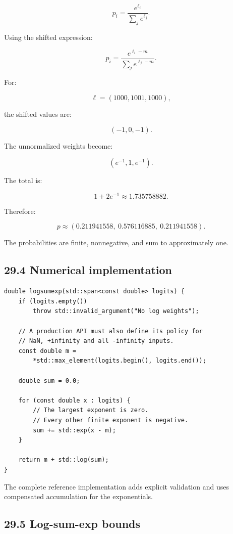 \[ \boxed{ p_i= \frac{e^{\ell_i}} {\sum_je^{\ell_j}} }. \]

Using the shifted expression:

\[ \boxed{ p_i= \frac{e^{\ell_i-m}} {\sum_je^{\ell_j-m}} }. \]

For:

\[ \ell=(1000,1001,1000), \]

the shifted values are:

\[ (-1,0,-1). \]

The unnormalized weights become:

\[ (e^{-1},1,e^{-1}). \]

The total is:

\[ 1+2e^{-1}\approx1.735758882. \]

Therefore:

\[ \boxed{ p\approx (0.211941558,\ 0.576116885,\ 0.211941558) }. \]

The probabilities are finite, nonnegative, and sum to approximately one.

\subsection{29.4 Numerical implementation}\label{02-foundations-ii-ch031-numerical-implementation}

\hypertarget{02-foundations-ii-ch031-numerical-implementation}{}

\begin{verbatim}
double logsumexp(std::span<const double> logits) {
    if (logits.empty())
        throw std::invalid_argument("No log weights");

    // A production API must also define its policy for
    // NaN, +infinity and all -infinity inputs.
    const double m =
        *std::max_element(logits.begin(), logits.end());

    double sum = 0.0;

    for (const double x : logits) {
        // The largest exponent is zero.
        // Every other finite exponent is negative.
        sum += std::exp(x - m);
    }

    return m + std::log(sum);
}
\end{verbatim}

The complete reference implementation adds explicit validation and uses compensated accumulation for the exponentials.

\subsection{29.5 Log-sum-exp bounds}\label{02-foundations-ii-ch031-log-sum-exp-bounds}

